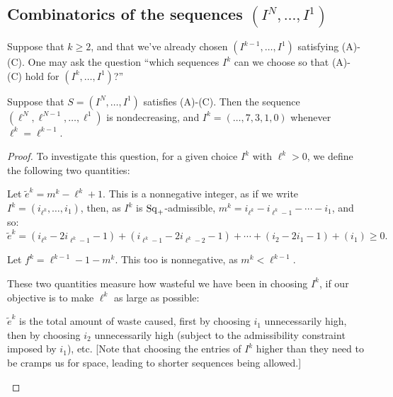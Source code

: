 \documentclass[10pt]{article}
\newcommand{\SqShift}{\Sq_{\smash{+}}}
\newcommand{\Sq}{\mathrm{Sq}}
\newcommand{\minDim}{m}
\begin{document}
\begin{KoszulSequenceCombinatorics}
\subsection{Combinatorics of  the sequences $(I^N,\ldots,I^1)$}
\begin{Omitted}
Suppose that $k\geq2$, and that we've already chosen $(I^{k-1},\ldots,I^1)$ satisfying \textup{(A)}-\textup{(C)}. One may ask the question ``which sequences $I^k$ can we choose so that \textup{(A)}-\textup{(C)} hold for $(I^{k},\ldots,I^1)$?''
\begin{prop}
Suppose that $S=(I^N,\ldots,I^1)$ satisfies \textup{(A)}-\textup{(C)}. Then the sequence $(\ell^N,\ell^{N-1},\ldots,\ell^1)$ is nondecreasing, and $I^k=(\ldots,7,3,1,0)$ whenever $\ell^k=\ell^{k-1}$.%
\end{prop}
\begin{proof}
To investigate this question, for a given choice $I^k$ with $\ell^{k}>0$, we define the following two quantities:
\begin{itemise}
\setlength{\parindent}{.25in}
\item Let $\widetilde{e}^k=\minDim^k-\ell^{k}+1$. This is a nonnegative integer, as if we write $I^k=(i_{\ell^k},\ldots,i_1)$, then, as $I^k$ is $\SqShift$-admissible, $\minDim^k=i_{\ell^k}-i_{\ell^k-1}-\cdots -i_1$, and so:
\[\widetilde{e}^k=(i_{\ell^k}-2i_{\ell^k-1}-1)+ (i_{\ell^k-1}-2i_{\ell^k-2}-1)+\cdots + (i_{2}-2i_{1}-1)+(i_1)\geq0.\]
\item Let $f^k=\ell^{k-1}-1-\minDim^k$. This too is nonnegative, as $\minDim^k<\ell^{k-1}$.
\end{itemise}
These two quantities measure how wasteful we have been in choosing $I^k$, if our objective is to make $\ell^k$ as large as possible:
\begin{itemise}
\setlength{\parindent}{.25in}
\item $\widetilde{e}^k$ is the total amount of waste caused, first by choosing $i_1$ unnecessarily high, then by choosing $i_2$ unnecessarily high (subject to the admissibility constraint imposed by $i_1$), etc. [Note that choosing the entries of $I^k$ higher than they need to be cramps us for space, leading to shorter sequences being allowed.]

\end{itemise}
\end{proof}
\end{Omitted}
\end{KoszulSequenceCombinatorics}
\end{document}
